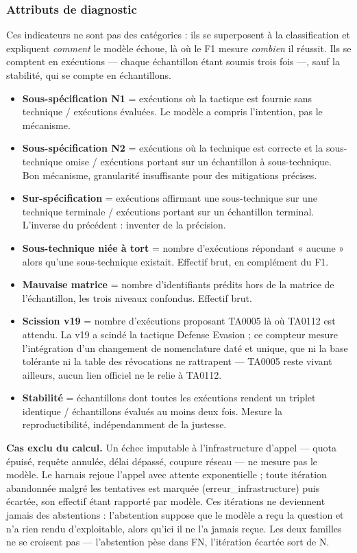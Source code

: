 \subsubsection{Attributs de diagnostic}\label{sec:2-5}
Ces indicateurs ne sont pas des catégories : ils se superposent à la classification et expliquent \emph{comment} le modèle échoue, là où le F1 mesure \emph{combien} il réussit. Ils se comptent en exécutions --- chaque échantillon étant soumis trois fois ---, sauf la stabilité, qui se compte en échantillons.

\begin{itemize}
\item
  \textbf{Sous-spécification N1} = exécutions où la tactique est fournie sans technique / exécutions évaluées. Le modèle a compris l'intention, pas le mécanisme.
\item
  \textbf{Sous-spécification N2} = exécutions où la technique est correcte et la sous-technique omise / exécutions portant sur un échantillon à sous-technique. Bon mécanisme, granularité insuffisante pour des mitigations précises.
\item
  \textbf{Sur-spécification} = exécutions affirmant une sous-technique sur une technique terminale / exécutions portant sur un échantillon terminal. L'inverse du précédent : inventer de la précision.
\item
  \textbf{Sous-technique niée à tort} = nombre d'exécutions répondant « aucune » alors qu'une sous-technique existait. Effectif brut, en complément du F1.
\item
  \textbf{Mauvaise matrice} = nombre d'identifiants prédits hors de la matrice de l'échantillon, les trois niveaux confondus. Effectif brut.
\item
  \textbf{Scission v19} = nombre d'exécutions proposant TA0005 là où TA0112 est attendu. La v19 a scindé la tactique Defense Evasion ; ce compteur mesure l'intégration d'un changement de nomenclature daté et unique, que ni la base tolérante ni la table des révocations ne rattrapent --- TA0005 reste vivant ailleurs, aucun lien officiel ne le relie à TA0112.
\item
  \textbf{Stabilité} = échantillons dont toutes les exécutions rendent un triplet identique / échantillons évalués au moins deux fois. Mesure la reproductibilité, indépendamment de la justesse.
\end{itemize}

\textbf{Cas exclu du calcul.} Un échec imputable à l'infrastructure d'appel --- quota épuisé, requête annulée, délai dépassé, coupure réseau --- ne mesure pas le modèle. Le harnais rejoue l'appel avec attente exponentielle ; toute itération abandonnée malgré les tentatives est marquée (erreur\_infrastructure) puis écartée, son effectif étant rapporté par modèle. Ces itérations ne deviennent jamais des abstentions : l'abstention suppose que le modèle a reçu la question et n'a rien rendu d'exploitable, alors qu'ici il ne l'a jamais reçue. Les deux familles ne se croisent pas --- l'abstention pèse dans FN, l'itération écartée sort de N.

